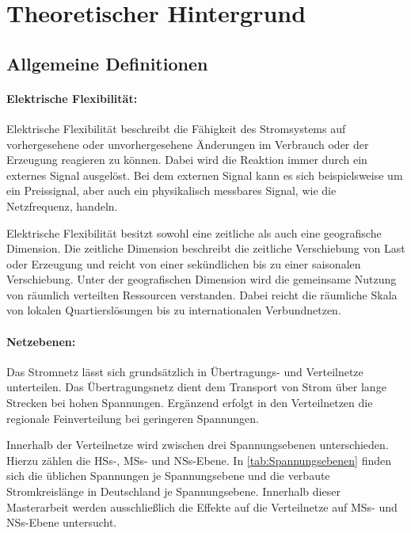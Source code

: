 \section{Theoretischer Hintergrund}

\subsection{Allgemeine Definitionen}

\paragraph{Elektrische Flexibilität:}


Elektrische Flexibilität beschreibt die Fähigkeit des Stromsystems auf vorhergesehene oder unvorhergesehene Änderungen im Verbrauch oder der Erzeugung reagieren zu können.
Dabei wird die Reaktion immer durch ein externes Signal ausgelöst.
Bei dem externen Signal kann es sich beispielsweise um ein Preissignal, aber auch ein physikalisch messbares Signal, wie die Netzfrequenz, handeln. \cite{BNetzA2017} \medskip

Elektrische Flexibilität besitzt sowohl eine zeitliche als auch eine geografische Dimension.
Die zeitliche Dimension beschreibt die zeitliche Verschiebung von Last oder Erzeugung und reicht von einer sekündlichen bis zu einer saisonalen Verschiebung.
Unter der geografischen Dimension wird die gemeinsame Nutzung von räumlich verteilten Ressourcen verstanden.
Dabei reicht die räumliche Skala von lokalen Quartierslösungen bis zu internationalen Verbundnetzen.


\paragraph{Netzebenen:}

Das Stromnetz lässt sich grundsätzlich in Übertragungs- und Verteilnetze unterteilen.
Das Übertragungsnetz dient dem Transport von Strom über lange Strecken bei hohen Spannungen.
Ergänzend erfolgt in den Verteilnetzen die regionale Feinverteilung bei geringeren Spannungen. \cite{Agora2019}\medskip

Innerhalb der Verteilnetze wird zwischen drei Spannungsebenen unterschieden. Hierzu zählen die \glspl{HS}-, \glspl{MS}- und \glspl{NS}-Ebene.
In \autoref{tab:Spannungsebenen} finden sich die üblichen Spannungen je Spannungsebene und die verbaute Stromkreislänge in Deutschland je Spannungsebene.
Innerhalb dieser Masterarbeit werden ausschließlich die Effekte auf die Verteilnetze auf \glspl{MS}- und \glspl{NS}-Ebene untersucht.

